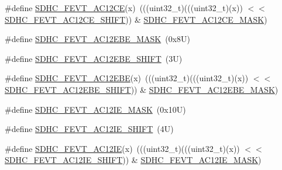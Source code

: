 \begin{DoxyCompactItemize}
\item 
\#define \mbox{\hyperlink{group___s_d_h_c___register___masks_gabc159915ebff810ddf7fd7c35e208f8e}{S\+D\+H\+C\+\_\+\+F\+E\+V\+T\+\_\+\+A\+C12\+CE}}(x)~(((uint32\+\_\+t)(((uint32\+\_\+t)(x)) $<$$<$ \mbox{\hyperlink{group___s_d_h_c___register___masks_ga6765ca9b4ffb1bf49aa914593c6d6476}{S\+D\+H\+C\+\_\+\+F\+E\+V\+T\+\_\+\+A\+C12\+C\+E\+\_\+\+S\+H\+I\+FT}})) \& \mbox{\hyperlink{group___s_d_h_c___register___masks_gabbde9b3a4bf7a5ba098a8793459a93e3}{S\+D\+H\+C\+\_\+\+F\+E\+V\+T\+\_\+\+A\+C12\+C\+E\+\_\+\+M\+A\+SK}})
\item 
\#define \mbox{\hyperlink{group___s_d_h_c___register___masks_gaf9bf81ce7359d8baeaa6da8d311a17df}{S\+D\+H\+C\+\_\+\+F\+E\+V\+T\+\_\+\+A\+C12\+E\+B\+E\+\_\+\+M\+A\+SK}}~(0x8\+U)
\item 
\#define \mbox{\hyperlink{group___s_d_h_c___register___masks_gad04d7f7589f8abb9ec05a978c7ec2ea9}{S\+D\+H\+C\+\_\+\+F\+E\+V\+T\+\_\+\+A\+C12\+E\+B\+E\+\_\+\+S\+H\+I\+FT}}~(3\+U)
\item 
\#define \mbox{\hyperlink{group___s_d_h_c___register___masks_gacb919064e5a37c74e4095216f3a02c97}{S\+D\+H\+C\+\_\+\+F\+E\+V\+T\+\_\+\+A\+C12\+E\+BE}}(x)~(((uint32\+\_\+t)(((uint32\+\_\+t)(x)) $<$$<$ \mbox{\hyperlink{group___s_d_h_c___register___masks_gad04d7f7589f8abb9ec05a978c7ec2ea9}{S\+D\+H\+C\+\_\+\+F\+E\+V\+T\+\_\+\+A\+C12\+E\+B\+E\+\_\+\+S\+H\+I\+FT}})) \& \mbox{\hyperlink{group___s_d_h_c___register___masks_gaf9bf81ce7359d8baeaa6da8d311a17df}{S\+D\+H\+C\+\_\+\+F\+E\+V\+T\+\_\+\+A\+C12\+E\+B\+E\+\_\+\+M\+A\+SK}})
\item 
\#define \mbox{\hyperlink{group___s_d_h_c___register___masks_gae0fbba676b66b6816ebf1a406cde14e2}{S\+D\+H\+C\+\_\+\+F\+E\+V\+T\+\_\+\+A\+C12\+I\+E\+\_\+\+M\+A\+SK}}~(0x10\+U)
\item 
\#define \mbox{\hyperlink{group___s_d_h_c___register___masks_gaeb6a120837319438325080701d73318b}{S\+D\+H\+C\+\_\+\+F\+E\+V\+T\+\_\+\+A\+C12\+I\+E\+\_\+\+S\+H\+I\+FT}}~(4\+U)
\item 
\#define \mbox{\hyperlink{group___s_d_h_c___register___masks_gaa9d85cb81ef3384a01f5769a1f6de421}{S\+D\+H\+C\+\_\+\+F\+E\+V\+T\+\_\+\+A\+C12\+IE}}(x)~(((uint32\+\_\+t)(((uint32\+\_\+t)(x)) $<$$<$ \mbox{\hyperlink{group___s_d_h_c___register___masks_gaeb6a120837319438325080701d73318b}{S\+D\+H\+C\+\_\+\+F\+E\+V\+T\+\_\+\+A\+C12\+I\+E\+\_\+\+S\+H\+I\+FT}})) \& \mbox{\hyperlink{group___s_d_h_c___register___masks_gae0fbba676b66b6816ebf1a406cde14e2}{S\+D\+H\+C\+\_\+\+F\+E\+V\+T\+\_\+\+A\+C12\+I\+E\+\_\+\+M\+A\+SK}})
\item 
$$
\end{DoxyCompactItemize}
